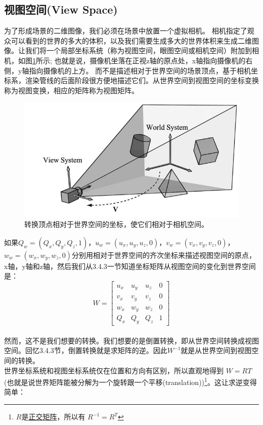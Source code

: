 \documentclass[11pt,a4paper,oldfontcommands]{memoir}
\begin{document}
{\subsection{视图空间(View Space)}
\begin{flushleft}
为了形成场景的二维图像，我们必须在场景中放置一个虚拟相机。 相机指定了观众可以看到的世界的多大的体积，以及我们需要生成多大的世界体积来生成二维图像。让我们将一个局部坐标系统（称为视图空间，眼图空间或相机空间）附加到相机，如图\ref{fig:5-19}所示; 也就是说，摄像机坐落在正视z轴的原点处，x轴指向摄像机的右侧，y轴指向摄像机的上方。 而不是描述相对于世界空间的场景顶点，基于相机坐标系，渲染管线的后面阶段很方便地描述它们。从世界空间到视图空间的坐标变换称为视图变换，相应的矩阵称为视图矩阵。\\
\begin{figure}[t]
    \includegraphics[width=\textwidth]{5-19}
    \centering
    \caption{转换顶点相对于世界空间的坐标，使它们相对于相机空间。}
    \label{fig:5-19}
\end{figure}
如果$Q_{w}=(Q_{x},Q_{y},Q_{z},1)$，$u_{w}=(u_{x},u_{y},u_{z},0)$，$v_{w}=(v_{x},v_{y},v_{z},0)$，$w_{w}=(w_{x},w_{y},w_{z},0)$分别用相对于世界空间的齐次坐标来描述视图空间的原点，x轴，y轴和z轴，然后我们从3.4.3一节知道坐标矩阵从视图空间的变化到世界空间是：
$$W=
\begin{bmatrix}
u_{x} & u_{y} & u_{z} & 0\\
v_{x} & v_{y} & v_{z} & 0\\
w_{x} & w_{y} & w_{z} & 0\\
Q_{x} & Q_{y} & Q_{z} & 1
\end{bmatrix}$$\\
然而，这不是我们想要的转换。我们想要的是倒置转换，即从世界空间转换成视图空间。回忆3.4.3节，倒置转换就是求矩阵的逆。因此$W^{-1}$就是从世界空间到视图空间的转换。\\
世界坐标系统和视图坐标系统仅在位置和方向有区别，所以直观地得到 $W=RT$(也就是说世界矩阵能被分解为一个旋转跟一个平移(translation))\footnote{$R$是\href{https://en.wikipedia.org/wiki/Orthogonal_matrix}{\textcolor{linkColor}{正交矩阵}}，所以有 $R^{-1}=R^{T}$}。这让求逆变得简单：

\end{flushleft}}
\end{document}
